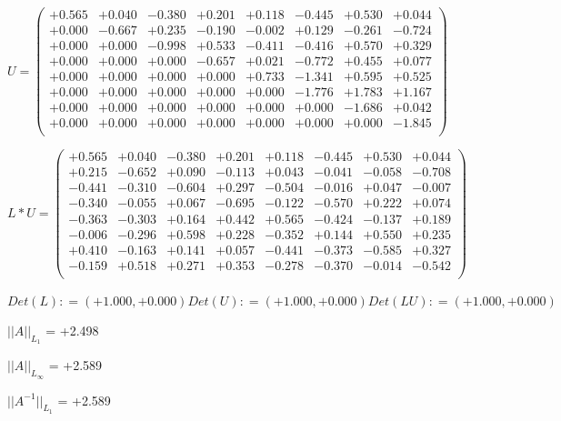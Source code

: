 \documentclass[9pt]{article}
\theoremstyle{plain}
\theoremstyle{definition}
\theoremstyle{remark}
\numberwithin{equation}{section}
\begin{document}
$U = \left(
\begin{array}{
cccccccc}
+0.565 & +0.040 & -0.380 & +0.201 & +0.118 & -0.445 & +0.530 & +0.044 \\
+0.000 & -0.667 & +0.235 & -0.190 & -0.002 & +0.129 & -0.261 & -0.724 \\
+0.000 & +0.000 & -0.998 & +0.533 & -0.411 & -0.416 & +0.570 & +0.329 \\
+0.000 & +0.000 & +0.000 & -0.657 & +0.021 & -0.772 & +0.455 & +0.077 \\
+0.000 & +0.000 & +0.000 & +0.000 & +0.733 & -1.341 & +0.595 & +0.525 \\
+0.000 & +0.000 & +0.000 & +0.000 & +0.000 & -1.776 & +1.783 & +1.167 \\
+0.000 & +0.000 & +0.000 & +0.000 & +0.000 & +0.000 & -1.686 & +0.042 \\
+0.000 & +0.000 & +0.000 & +0.000 & +0.000 & +0.000 & +0.000 & -1.845 \\
\end{array}
\right)$ \newline 

$L * U  = \left(
\begin{array}{
cccccccc}
+0.565 & +0.040 & -0.380 & +0.201 & +0.118 & -0.445 & +0.530 & +0.044 \\
+0.215 & -0.652 & +0.090 & -0.113 & +0.043 & -0.041 & -0.058 & -0.708 \\
-0.441 & -0.310 & -0.604 & +0.297 & -0.504 & -0.016 & +0.047 & -0.007 \\
-0.340 & -0.055 & +0.067 & -0.695 & -0.122 & -0.570 & +0.222 & +0.074 \\
-0.363 & -0.303 & +0.164 & +0.442 & +0.565 & -0.424 & -0.137 & +0.189 \\
-0.006 & -0.296 & +0.598 & +0.228 & -0.352 & +0.144 & +0.550 & +0.235 \\
+0.410 & -0.163 & +0.141 & +0.057 & -0.441 & -0.373 & -0.585 & +0.327 \\
-0.159 & +0.518 & +0.271 & +0.353 & -0.278 & -0.370 & -0.014 & -0.542 \\
\end{array}
\right)$ \newline 

$Det(L) :    = (+1.000,+0.000)     Det(U) :    = (+1.000,+0.000)     Det(LU) :    = (+1.000,+0.000)$

$||A||_{L_1}$  = +2.498

$||A||_{L_{\infty}}$ = +2.589

$||A^{-1}||_{L_1}$  = +2.589
\end{document}
